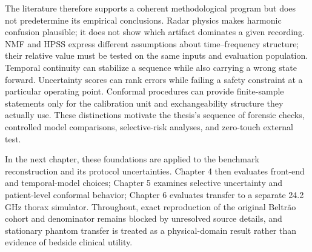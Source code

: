 The literature therefore supports a coherent methodological program but does not predetermine its
empirical conclusions. Radar physics makes harmonic confusion plausible; it does not show which
artifact dominates a given recording. NMF and HPSS express different assumptions about
time--frequency structure; their relative value must be tested on the same inputs and evaluation
population. Temporal continuity can stabilize a sequence while also carrying a wrong state forward.
Uncertainty scores can rank errors while failing a safety constraint at a particular operating
point. Conformal procedures can provide finite-sample statements only for the calibration unit and
exchangeability structure they actually use. These distinctions motivate the thesis's sequence of
forensic checks, controlled model comparisons, selective-risk analyses, and zero-touch external
test.

In the next chapter, these foundations are applied to the benchmark reconstruction and its
protocol uncertainties. Chapter 4 then evaluates front-end and temporal-model choices; Chapter 5
examines selective uncertainty and patient-level conformal behavior; Chapter 6 evaluates transfer
to a separate 24.2 GHz thorax simulator. Throughout, exact reproduction of the original Beltr\~ao
cohort and denominator remains blocked by unresolved source details, and stationary phantom
transfer is treated as a physical-domain result rather than evidence of bedside clinical utility.
